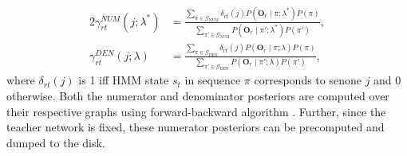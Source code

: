 \documentclass{article}
\newcommand{\oOr}[1]{\mathbf{O}_{#1}}
\newcommand{\deltar}[1]{\delta_{#1}}
\newcommand{\pr}{{P}}
\newcommand{\DenG}{\mathcal{G}_\text{DEN}}
\newcommand{\NumG}{\mathcal{G}_\text{NUM}}
\newcommand{\NumPost}[1]{\gamma_{rt}^{NUM}(j;#1)}
\newcommand{\DenPost}[1]{\gamma_{rt}^{DEN}(j;#1)}
\begin{document}
\begin{alignat}{2}
  \NumPost{\lambda^*} &= \frac{\sum_{\pi\in\NumG}
  \deltar{rt}(j) \pr(\oOr{r}\mid \pi; \lambda^*) \pr(\pi)} {\sum_{\pi'\in\NumG}
  \pr(\oOr{r}\mid \pi'; \lambda^*) \pr(\pi')}, \label{eq:num-post} \\
  \DenPost{\lambda} &= \frac{\sum_{\pi\in\DenG}
  \deltar{rt}(j) \pr(\oOr{r}\mid \pi; \lambda) \pr(\pi)} {\sum_{\pi'\in\DenG}
  \pr(\oOr{r}\mid \pi'; \lambda) \pr(\pi')}, \label{eq:den-post}
\end{alignat}
where $\deltar{rt}(j)$ is 1 iff HMM state $s_t$ in sequence $\pi$ corresponds
to senone $j$ and 0 otherwise. Both the numerator and denominator posteriors
are computed over their respective graphs using forward-backward algorithm
\cite{rabiner1989tutorial}. Further, since the teacher network is fixed, these numerator posteriors can be precomputed and dumped to the disk. 

%
%
\end{document}
